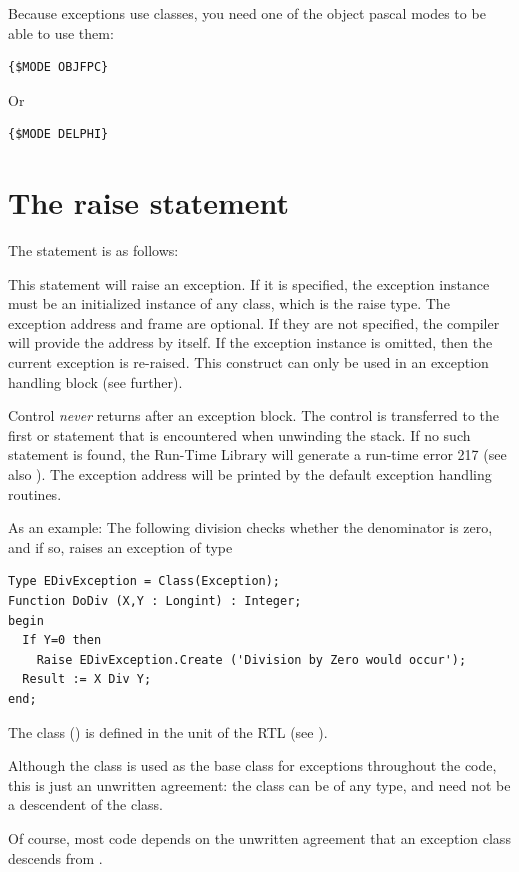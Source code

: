 \begin{remark}
Because exceptions use classes, you need one of the object pascal modes to
be able to use them:
\begin{verbatim}
{$MODE OBJFPC}
\end{verbatim}
Or
\begin{verbatim}
{$MODE DELPHI}
\end{verbatim}
\end{remark}
\section{The raise statement}
The  statement is as follows:

This statement will raise an exception. If it is specified, the exception
instance must be an initialized instance of any class, which is the raise
type. The exception address and frame are optional. If they are not specified,
the compiler will provide the address by itself. If the exception instance is omitted,
then the current exception is re-raised. This construct can only be used
in an exception handling block (see further).

\begin{remark} Control {\em never} returns after an exception block. The
control is transferred to the first  or
 statement that is encountered when unwinding the stack.
If no such statement is found, the \fpc Run-Time Library will generate a
run-time error 217 (see also ). The exception address
will be printed by the default exception handling routines.
\end{remark}

As an example: The following division checks whether the denominator is
zero, and if so, raises an exception of type 
\begin{verbatim}
Type EDivException = Class(Exception);
Function DoDiv (X,Y : Longint) : Integer;
begin
  If Y=0 then
    Raise EDivException.Create ('Division by Zero would occur');
  Result := X Div Y;
end;
\end{verbatim}
The class  () is defined in the
 unit of the RTL (see \unitsref).


\begin{remark}
Although the  class is used as the base class for exceptions
throughout the code, this is just an unwritten agreement: the class can
be of any type, and need not be a descendent of the  class.

Of course, most code depends on the unwritten agreement that an exception
class descends from .
\end{remark}

